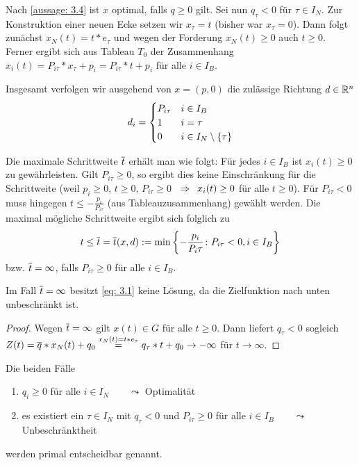 Nach \cref{aussage: 3.4} ist $x$ optimal, falls $q \ge 0$ gilt. Sei nun $q_\tau < 0$ für $\tau \in I_N$. Zur Konstruktion einer neuen Ecke setzen wir $x_\tau = t$ (bisher war $x_\tau = 0$). Dann folgt zunächst $x_N(t) = t * e_\tau$ und wegen der Forderung $x_N(t) \ge 0$ auch $t \ge 0$. Ferner ergibt sich aus Tableau $T_0$ der Zusammenhang $x_i(t) = P_{i \tau} * x_\tau + p_i = P_{i \tau} * t + p_i$ für alle $i \in I_B$.

Insgesamt verfolgen wir ausgehend von $x =(p,0)$ die zulässige Richtung $d \in \mathbb{R}^n$
\begin{equation*}
	d_i = \begin{cases}
	P_{i \tau} & i \in I_B \\
	1 & i = \tau \\
	0 & i \in I_N \setminus \left\{ \tau \right\}
\end{cases}
\end{equation*}

Die maximale Schrittweite $\overline{t}$ erhält man wie folgt: Für jedes $i \in I_B$ ist $x_i(t) \ge 0$ zu gewährleisten. Gilt $P_{i \tau} \ge 0$, so ergibt dies keine Einschränkung für die Schrittweite (weil $p_i \ge 0$, $t \ge 0$, $P_{i \tau} \ge 0$ $\enskip \Rightarrow \enskip x_i(t) \ge 0$ für alle $t \ge 0$). Für $P_{i \tau} < 0$ muss hingegen $t \le - \frac{p_i}{P_{i \tau}}$ (aus Tableauzusammenhang) gewählt werden. Die maximal mögliche Schrittweite ergibt sich folglich zu
\begin{equation}
t \le \overline{t} = \overline{t}(x,d) \mathrel{:=} \min\left\{ - \frac{p_i}{P_i \tau} \colon P_{i \tau} < 0, i \in I_B \right\}
\label{eq: 3.6}
\end{equation}
bzw. $\overline{t} = \infty$, falls $P_{i \tau} \ge 0$ für alle $i \in I_B$.

\begin{aussage} %
	Im Fall $\overline{t} = \infty$ besitzt \eqref{eq: 3.1} keine Lösung, da die Zielfunktion nach unten unbeschränkt ist.
\end{aussage}
\begin{proof}
	Wegen $\overline{t} = \infty$ gilt $x(t) \in G$ für alle $t \ge 0$. Dann liefert $q_\tau < 0$ sogleich $Z(t) = \overline{q} * x_N(t) + q_0 \overset{x_N(t) = t * e_\tau}{=} q_\tau * t + q_0 \to - \infty$ für $t \to \infty$.
\end{proof}

\begin{bemerkung} %
	Die beiden Fälle 
	\begin{enumerate}[nolistsep, topsep=-\parskip]
		\item $q_i \ge 0$ für alle $i \in I_N \qquad \leadsto$ Optimalität
		\item es existiert ein $\tau \in I_N$ mit $q_\tau < 0$ und $P_{i \tau} \ge 0$ für alle $i \in I_B \qquad \leadsto$ Unbeschränktheit
	\end{enumerate}
	werden primal entscheidbar genannt.
\end{bemerkung}

